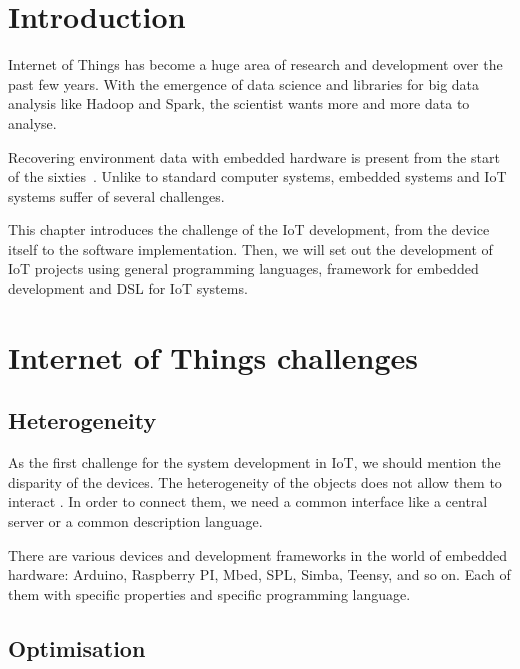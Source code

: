 
\section{Introduction}
\label{sec:iot_challenge_intro}

Internet of Things has become a huge area of research and development over the past few
years. With the emergence of data science and libraries for big data analysis
like Hadoop and Spark, the scientist wants more and more data to
analyse.

Recovering environment data with embedded hardware is present from the start of
the sixties~\cite{Community2017}. Unlike to standard computer systems, embedded
systems and \gls{IoT} systems suffer of several challenges.

This chapter introduces the challenge of the \gls{IoT} development, from the device
itself to the software implementation. Then, we will set out the development of
\gls{IoT} projects using general programming languages, framework for embedded
development and \gls{DSL} for \gls{IoT} systems.

\section{Internet of Things challenges}
\label{sec:iot_challenges}

\subsection{Heterogeneity}
\label{sec:heterogeneity}

As the first challenge for the system development in \gls{IoT}, we should
mention the disparity of the devices. The heterogeneity of the objects does not
allow them to interact \cite{midgar}. In order to connect them, we need a
common interface like a central server or a common description language.

There are various devices and development frameworks in the world of
embedded hardware: Arduino, Raspberry PI, Mbed, SPL, Simba, Teensy, and so
on. Each of them with specific properties and specific programming language.

\subsection{Optimisation}
\label{sec:iot_challenge_optimisation}

